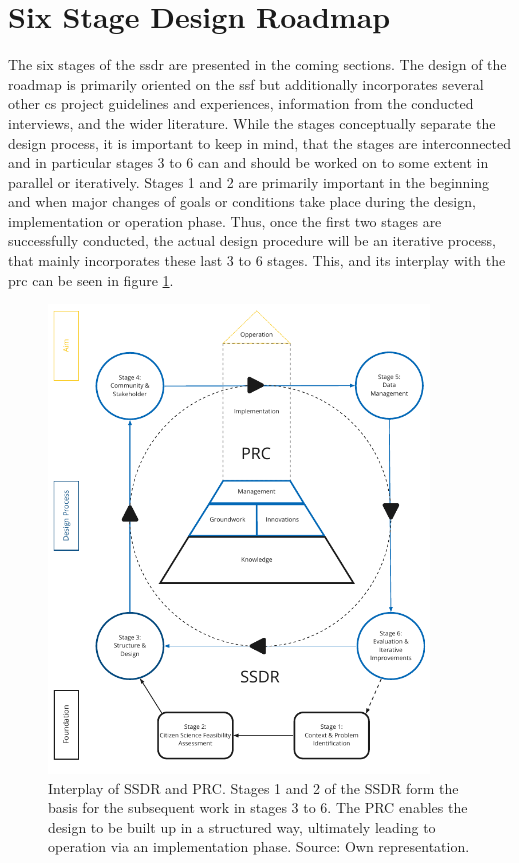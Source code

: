 \section{Six Stage Design Roadmap}\label{sec:ssdr}
The six stages of the \acrshort{ssdr} are presented in the coming sections. The design of the roadmap is primarily oriented on the \acrshort{ssf} but additionally incorporates several other \acrshort{cs} project guidelines and experiences, information from the conducted interviews, and the wider literature. While the stages conceptually separate the design process, it is important to keep in mind, that the stages are interconnected and in particular stages 3 to 6 can and should be worked on to some extent in parallel or iteratively. Stages 1 and 2 are primarily important in the beginning and when major changes of goals or conditions take place during the design, implementation or operation phase. Thus, once the first two stages are successfully conducted, the actual design procedure will be an iterative process, that mainly incorporates these last 3 to 6 stages. This, and its interplay with the \acrshort{prc} can be seen in figure \ref{fig:res_ssdr_prc}.\newline

\begin{figure}[!htp]
    \centering
    \includegraphics[width=0.9\textwidth]{figures/2023_MA_results_ssdr_prc.pdf}
    \decoRule
    \caption[Interplay of SSDR and PRC]{Interplay of SSDR and PRC. Stages 1 and 2 of the SSDR form the basis for the subsequent work in stages 3 to 6. The PRC enables the design to be built up in a structured way, ultimately leading to operation via an implementation phase. Source: Own representation.}
    \label{fig:res_ssdr_prc}
\end{figure}

